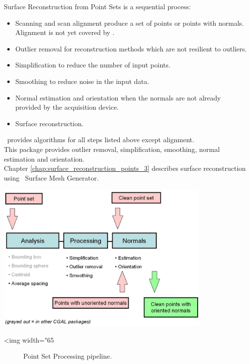 Surface Reconstruction from Point Sets is a sequential process:

\begin{itemize}
\item Scanning and scan alignment produce a set of points
      or points with normals. Alignment is not yet
      covered by \cgal.
\item Outlier removal for reconstruction methods which
      are not resilient to outliers.
\item Simplification to reduce the number of input points.
\item Smoothing to reduce noise in the input data.
\item Normal estimation and orientation when the normals
      are not already provided by the acquisition device.
\item Surface reconstruction.
\end{itemize}

\cgal\ provides algorithms for all steps listed above except alignment.\\
This package provides outlier removal, simplification, smoothing,
normal estimation and orientation.\\
Chapter  \ref{chap:surface_reconstruction_points_3}
describes surface reconstruction using \cgal\ Surface Mesh Generator.

\begin{center}
    \label{Point_set_processing_3-fig-pipeline}
    \begin{ccTexOnly}
        \includegraphics[width=0.8\textwidth]{Point_set_processing_3/pipeline} %
    \end{ccTexOnly}
    \begin{ccHtmlOnly}
        <img width="65%
    \end{ccHtmlOnly}
    \begin{figure}[h]
        \caption{Point Set Processing pipeline.}
    \end{figure}
\end{center}


